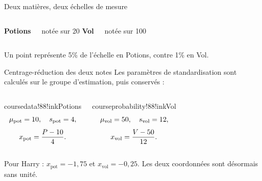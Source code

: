 \begin{frame}[t]{Deux matières, deux échelles de mesure}
  \vspace{2mm}
  \begin{columns}[T,onlytextwidth]
      \centering
      {\bfseries\color{coursedata!88!ink} Potions}
      \par notée sur 20
      \centering
      {\bfseries\color{courseprobability!88!ink} Vol}
      \par notée sur 100
  \end{columns}
  \vfill
  Un point représente 5\% de l'échelle en Potions, contre 1\% en Vol.
\end{frame}

\begin{frame}[t]{Centrage-réduction des deux notes}
  \vspace{2mm}
  Les paramètres de standardisation sont calculés sur le groupe d'estimation,
  puis conservés :
  \begin{columns}[T,onlytextwidth]
      \begin{coursecallout}{coursedata!88!ink}{Potions}
        \[
          \mu_{\mathrm{pot}}=10,
          \quad s_{\mathrm{pot}}=4,
        \]
        \[
          x_{\mathrm{pot}}=
          \frac{P-10}{4}.
        \]
      \end{coursecallout}
      \begin{coursecallout}{courseprobability!88!ink}{Vol}
        \[
          \mu_{\mathrm{vol}}=50,
          \quad s_{\mathrm{vol}}=12,
        \]
        \[
          x_{\mathrm{vol}}=
          \frac{V-50}{12}.
        \]
      \end{coursecallout}
  \end{columns}
  \vfill
  Pour Harry : \(x_{\mathrm{pot}}=-1{,}75\) et
  \(x_{\mathrm{vol}}=-0{,}25\). Les deux coordonnées sont désormais sans unité.
\end{frame}

